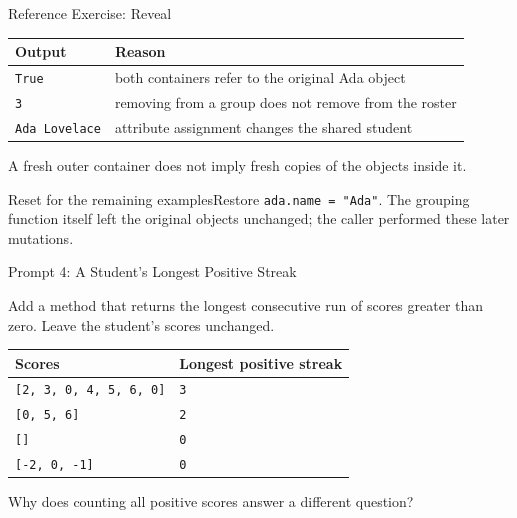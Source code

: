\documentclass[aspectratio=169,10pt]{beamer}
\begin{document}
\begin{frame}{Reference Exercise: Reveal}
\small
\begin{center}
\begin{tabular}{ll}
\textbf{Output} & \textbf{Reason}\\\hline
\texttt{True} & both containers refer to the original Ada object\\[6pt]
\texttt{3} & removing from a group does not remove from the roster\\[6pt]
\texttt{Ada Lovelace} & attribute assignment changes the shared student
\end{tabular}
\end{center}
\begin{keyidea}A fresh outer container does not imply fresh copies of the objects inside it.\end{keyidea}
\begin{block}{Reset for the remaining examples}Restore \texttt{ada.name = "Ada"}. The grouping function itself left the original objects unchanged; the caller performed these later mutations.\end{block}
\end{frame}


\begin{frame}{Prompt 4: A Student's Longest Positive Streak}
\small
\begin{activity}
Add a method that returns the longest consecutive run of scores greater than zero. Leave the student's scores unchanged.
\end{activity}
\begin{center}
\begin{tabular}{ll}
\textbf{Scores} & \textbf{Longest positive streak}\\\hline
\texttt{[2, 3, 0, 4, 5, 6, 0]} & \texttt{3}\\
\texttt{[0, 5, 6]} & \texttt{2}\\
\texttt{[]} & \texttt{0}\\
\texttt{[-2, 0, -1]} & \texttt{0}
\end{tabular}
\end{center}
\begin{activity}Why does counting all positive scores answer a different question?\end{activity}
\end{frame}
\end{document}
